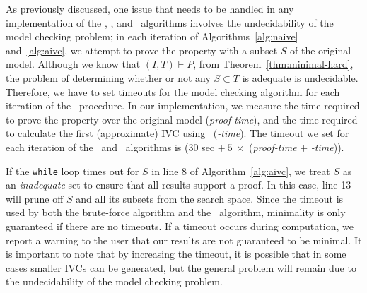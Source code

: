 As previously discussed, one issue that needs to
be handled in any implementation of the \ucalg, \ucbfalg, and \aivcalg~algorithms involves the undecidability of the model checking problem;
in each iteration of Algorithms~\ref{alg:naive} and~\ref{alg:aivc}, we attempt to prove the property with a subset $S$ of the original model.  Although we know that $(I, T) \vdash P$, from Theorem~\ref{thm:minimal-hard}, the problem of determining whether or not any $S \subset T$ is adequate is undecidable.
%
Therefore, we have to set timeouts for the model checking algorithm for each iteration of the \aivcalg\ procedure.
In our implementation, we measure the time required to prove the property over the original model (\emph{proof-time}), and the time required to calculate the first
(approximate) IVC using \ucalg\ (\emph{\ucalg-time}).
The timeout we set for each iteration of the \ucbfalg\ and \aivcalg\ algorithms is ($30$ sec  $+\ 5\ \times$ (\emph{proof-time} $+$ \emph{\ucalg-time})).

If the \texttt{while} loop times out for $S$ in line 8 of Algorithm~\ref{alg:aivc},
we treat $S$ as an \emph{inadequate} set to ensure that all results support a proof.
In this case, line 13 will prune off $S$ and all
its subsets from the search space.  Since the timeout is used by both the brute-force
algorithm and the \aivcalg\ algorithm, minimality is only guaranteed if there
are no timeouts.  If a timeout occurs during computation, we report a warning to the user that our results are not guaranteed to be minimal.
It is important to note that by increasing the timeout, it is possible that
in some cases smaller IVCs can be generated, but the general problem will remain due
to the undecidability of the model checking problem.




%

